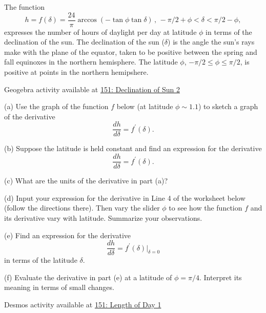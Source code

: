 \documentclass{ximera}
\begin{document}
\begin{question}  \label{Q:er43455}
The function
\[
    h = f(\delta) = \frac{24}{\pi} \arccos(-\tan\phi \tan\delta) \, , \, -\pi/2+\phi < \delta < \pi/2-\phi ,
\]
expresses the number of hours of daylight per day at latitude $\phi$ in terms of the declination of the sun. The declination of the sun ($\delta$) is the angle the sun's rays make with the plane of the equator, taken to be positive between the spring and fall equinoxes in the northern hemisphere. The latitude $\phi$, $-\pi/2 \leq \phi \leq \pi/2$, is positive at points in the northern hemipshere.

\begin{onlineOnly}
    \begin{center}
\end{center}
\end{onlineOnly}

Geogebra activity available at \href{https://www.geogebra.org/classic/vnhrutwu}{151: Declination of Sun 2}


(a) Use the graph of the function $f$ below (at latitude $\phi \sim 1.1$) to sketch a graph of the derivative
\[
   \frac{dh}{d\delta} = f^\prime(\delta) .
\]

(b) Suppose the latitude is held constant and find an expression for the derivative 
\[
   \frac{dh}{d\delta} = f^\prime(\delta) .
\]

(c) What are the units of the derivative in part (a)?

(d) Input your expression for the derivative in Line 4 of the worksheet below (follow the directions there). Then vary the slider $\phi$ to see how the function $f$ and its derivative vary with latitude. Summarize your observations.

(e) Find an expression for the derivative 
\[
   \frac{dh}{d\delta} = f^\prime(\delta) \Big|_{\delta = 0}
\]
in terms of the latitude $\delta$. 

(f) Evaluate the derivative in part (e) at a latitude of $\phi =\pi/4$. Interpret its meaning in terms of small changes.

\begin{onlineOnly}
    \begin{center}
\end{center}
\end{onlineOnly}

Desmos activity available at \href{https://www.desmos.com/calculator/ifomatkcta}{151: Length of Day 1}


\end{question}
\end{document}
